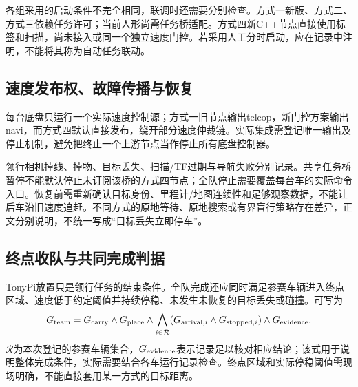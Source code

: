 各组采用的启动条件不完全相同，联调时还需要分别检查。方式一新版、方式二、方式三依赖任务许可；当前人形尚需任务桥适配。方式四新C++节点直接使用标签和扫描，尚未接入或同一个独立速度门控。若采用人工分时启动，应在记录中注明，不能将其称为自动任务联动。

\subsection{速度发布权、故障传播与恢复}
每台底盘只运行一个实际速度控制源；方式一旧节点输出teleop，新门控方案输出navi，而方式四默认直接发布，绕开部分速度仲裁链。实际集成需登记唯一输出及停止机制，避免把终止一个上游节点当作停止所有底盘控制器。

领行相机掉线、掉物、目标丢失、扫描/TF过期与导航失败分别记录。共享任务桥暂停不能默认停止未订阅该桥的方式四节点；全队停止需要覆盖每台车的实际命令入口。恢复前需重新确认目标身份、里程计/地图连续性和足够观察数据，不能让后车沿旧速度追赶。不同方式的原地等待、原地搜索或有界盲行策略存在差异，正文分别说明，不统一写成“目标丢失立即停车”。

\subsection{终点收队与共同完成判据}
TonyPi放置只是领行任务的结束条件。全队完成还应同时满足参赛车辆进入终点区域、速度低于约定阈值并持续停稳、未发生未恢复的目标丢失或碰撞。可写为
\begin{equation}
G_{\rm team}=G_{\rm carry}\land G_{\rm place}\land
\bigwedge_{i\in\mathcal R}(G_{{\rm arrival},i}\land G_{{\rm stopped},i})
\land G_{\rm evidence}.
\end{equation}
$\mathcal R$为本次登记的参赛车辆集合，$G_{\rm evidence}$表示记录足以核对相应结论；该式用于说明整体完成条件，实际需要结合各车运行记录检查。终点区域和实际停稳阈值需现场明确，不能直接套用某一方式的目标距离。
